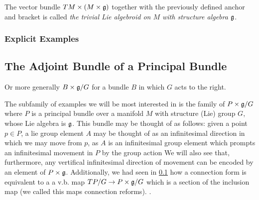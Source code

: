 The vector bundle $TM \times (M \times \mathfrak{g})$ together with the previously defined anchor and bracket is called \emph{the trivial Lie algebroid on $M$ with structure algebra $\mathfrak{g}$}.

\subsubsection{Explicit Examples}



\subsection{The Adjoint Bundle of a Principal Bundle}

Or more generally $B \times \mathfrak{g} / G$ for a bundle $B$ in which $G$ acts to the right.

The subfamily of examples we will be most interested in is the family of $P \times \mathfrak{g}/G$ where $P$ is a principal bundle over a manifold $M$ with structure (Lie) group $G$, whose Lie  algebra is $\mathfrak{g}$. This bundle may be thought of as follows: given a point $p \in P$, a lie group element $A$ may be thought of as an infinitesimal direction in which we may move from $p$, as $A$ is an infinitesimal group element which prompts an infinitesimal movement in $P$ by the group action We will also see that, furthermore, any vertifical infinitesimal direction of movement can be encoded by an element of $P \times \mathfrak{g}$. Additionally, we had seen in \ref{} how a connection form is equivalent to a  a v.b. map $TP/G \to P \times \mathfrak{g}/G$ which is a section of the inclusion map (we called this maps connection reforms). .


